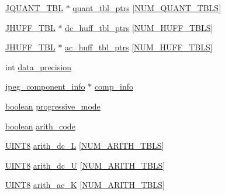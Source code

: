 \begin{DoxyCompactItemize}
\hyperlink{struct_j_q_u_a_n_t___t_b_l}{J\+Q\+U\+A\+N\+T\+\_\+\+T\+BL} $\ast$ \hyperlink{structjpeg__decompress__struct_a42be2e7197a38cf83e6cebbaac006ca6}{quant\+\_\+tbl\+\_\+ptrs} \mbox{[}\hyperlink{jpeglib_8h_ab3254a23612ea48615001fffc0c9f691}{N\+U\+M\+\_\+\+Q\+U\+A\+N\+T\+\_\+\+T\+B\+LS}\mbox{]}
\item 
\hyperlink{struct_j_h_u_f_f___t_b_l}{J\+H\+U\+F\+F\+\_\+\+T\+BL} $\ast$ \hyperlink{structjpeg__decompress__struct_a805ecdbfbc59d66a6879de06dc4c35e0}{dc\+\_\+huff\+\_\+tbl\+\_\+ptrs} \mbox{[}\hyperlink{jpeglib_8h_a6b12985705944e0623b671f29dc5722e}{N\+U\+M\+\_\+\+H\+U\+F\+F\+\_\+\+T\+B\+LS}\mbox{]}
\item 
\hyperlink{struct_j_h_u_f_f___t_b_l}{J\+H\+U\+F\+F\+\_\+\+T\+BL} $\ast$ \hyperlink{structjpeg__decompress__struct_a8d6e49569f3edc0ad43ffa5d6a95bb48}{ac\+\_\+huff\+\_\+tbl\+\_\+ptrs} \mbox{[}\hyperlink{jpeglib_8h_a6b12985705944e0623b671f29dc5722e}{N\+U\+M\+\_\+\+H\+U\+F\+F\+\_\+\+T\+B\+LS}\mbox{]}
\item 
int \hyperlink{structjpeg__decompress__struct_ad55d8fc56faa42d05d1a80ad84ce3e9c}{data\+\_\+precision}
\item 
\hyperlink{structjpeg__component__info}{jpeg\+\_\+component\+\_\+info} $\ast$ \hyperlink{structjpeg__decompress__struct_afb7ab593b5699842965eccb64e6e200a}{comp\+\_\+info}
\item 
\hyperlink{jconfig_8h_a7670a4e8a07d9ebb00411948b0bbf86d}{boolean} \hyperlink{structjpeg__decompress__struct_a6e2f9fd1cba287dc632070f3c8390d1c}{progressive\+\_\+mode}
\item 
\hyperlink{jconfig_8h_a7670a4e8a07d9ebb00411948b0bbf86d}{boolean} \hyperlink{structjpeg__decompress__struct_aa59d02c7dfa58e22321c1f5fa154b151}{arith\+\_\+code}
\item 
\hyperlink{jmorecfg_8h_adfb9a8ea1dd59f151065f763e1e9acd6}{U\+I\+N\+T8} \hyperlink{structjpeg__decompress__struct_a746b5ecfe0401a1ffe423191d4b929b0}{arith\+\_\+dc\+\_\+L} \mbox{[}\hyperlink{jpeglib_8h_a4efb0fccc8d9db72ca18f32a26fad6ab}{N\+U\+M\+\_\+\+A\+R\+I\+T\+H\+\_\+\+T\+B\+LS}\mbox{]}
\item 
\hyperlink{jmorecfg_8h_adfb9a8ea1dd59f151065f763e1e9acd6}{U\+I\+N\+T8} \hyperlink{structjpeg__decompress__struct_af181cece11c6bb960cb97f648f0e67aa}{arith\+\_\+dc\+\_\+U} \mbox{[}\hyperlink{jpeglib_8h_a4efb0fccc8d9db72ca18f32a26fad6ab}{N\+U\+M\+\_\+\+A\+R\+I\+T\+H\+\_\+\+T\+B\+LS}\mbox{]}
\item 
\hyperlink{jmorecfg_8h_adfb9a8ea1dd59f151065f763e1e9acd6}{U\+I\+N\+T8} \hyperlink{structjpeg__decompress__struct_a9c54eeff8fd2af185c34be22e5c21420}{arith\+\_\+ac\+\_\+K} \mbox{[}\hyperlink{jpeglib_8h_a4efb0fccc8d9db72ca18f32a26fad6ab}{N\+U\+M\+\_\+\+A\+R\+I\+T\+H\+\_\+\+T\+B\+LS}\mbox{]}

\end{DoxyCompactItemize}
